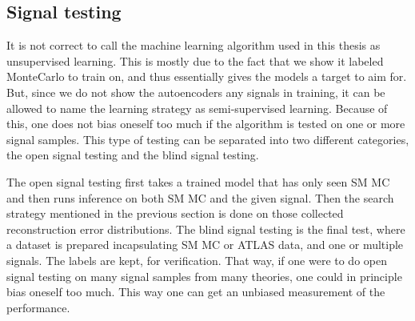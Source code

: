 \subsection*{Signal testing}
It is not correct to call the machine learning algorithm used in this thesis as unsupervised learning. 
This is mostly due to the fact that we show it labeled MonteCarlo to train on, and thus essentially gives 
the models a target to aim for. But, since we do not show the autoencoders any signals in training, it can be allowed to 
name the learning strategy as semi-supervised learning. Because of this, one does not bias oneself too much 
if the algorithm is tested on one or more signal samples. This type of testing can be separated into two
different categories, the open signal testing and the blind signal testing. \par 
The open signal testing first takes a trained model that has only seen SM MC and then runs inference on both 
SM MC and the given signal. Then the search strategy mentioned in the previous section is done on those 
collected reconstruction error distributions. The blind signal testing is the final test, where a dataset 
is prepared incapsulating SM MC or ATLAS data, and one or multiple signals. The labels are kept, for verification. 
That way, if one were to do open signal testing on many signal samples from many theories, one could 
in principle bias oneself too much. This way one can get an unbiased measurement of the performance. 